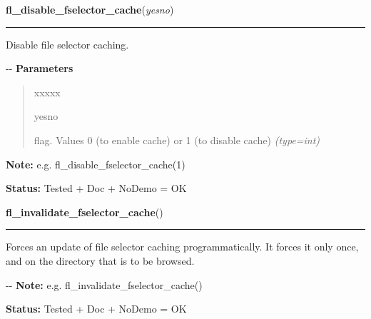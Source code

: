 \hspace{.8\funcindent}\begin{boxedminipage}{\funcwidth}

    \raggedright \textbf{fl\_disable\_fselector\_cache}(\textit{yesno})

    \vspace{-1.5ex}

    \rule{\textwidth}{0.5\fboxrule}
\setlength{\parskip}{2ex}

Disable file selector caching.

-{}-
\setlength{\parskip}{1ex}
      \textbf{Parameters}
      \vspace{-1ex}

      \begin{quote}
        \begin{Ventry}{xxxxx}

          \item[yesno]


flag. Values 0 (to enable cache) or 1 (to disable cache)
            {\it (type=int)}

        \end{Ventry}

      \end{quote}

\textbf{Note:} 
e.g. fl\_disable\_fselector\_cache(1)


\textbf{Status:} 
Tested + Doc + NoDemo = OK


    \end{boxedminipage}

    \label{xformslib:flgoodies:fl_invalidate_fselector_cache}

    \vspace{0.5ex}

\hspace{.8\funcindent}\begin{boxedminipage}{\funcwidth}

    \raggedright \textbf{fl\_invalidate\_fselector\_cache}()

    \vspace{-1.5ex}

    \rule{\textwidth}{0.5\fboxrule}
\setlength{\parskip}{2ex}

Forces an update of file selector caching programmatically. It forces
it only once, and on the directory that is to be browsed.

-{}-
\setlength{\parskip}{1ex}
\textbf{Note:} 
e.g. fl\_invalidate\_fselector\_cache()


\textbf{Status:} 
Tested + Doc + NoDemo = OK


    \end{boxedminipage}

